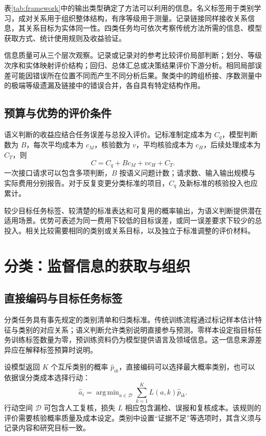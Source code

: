 \documentclass[UTF8,a4paper,zihao=-4,fontset=fandol]{ctexart}
\DeclareMathOperator*{\argmin}{arg\,min}
\begin{document}
表\ref{tab:framework}中的输出类型确定了方法可以利用的信息。名义标签用于类别学习，成对关系用于组织整体结构，有序等级用于测量。记录链接同样接收关系信息，其关系目标为实体同一性。四类任务均可依次考察传统方法所需的信息、模型获取方式、统计使用规则及收益验证。

信息质量可从三个层次观察。记录或记录对的参考比较评价局部判断；划分、等级次序和实体映射评价结构；回归、总体汇总或决策结果评价下游分析。相同局部误差可能因错误所在位置不同而产生不同分析后果。聚类中的跨组桥接、序数测量中的极端等级遗漏及链接中的错误合并，各自具有特定结构作用。

\subsection{预算与优势的评价条件}

语义判断的收益应结合任务误差与总投入评价。记标准制定成本为 $C_q$，模型判断数为 $B$，每次平均成本为 $c_M$，核验数为 $v$，平均核验成本为 $c_H$，后续处理成本为 $C_T$，则
\begin{equation}
 C=C_q+B c_M+v c_H+C_T.
 \label{eq:cost}
\end{equation}
一次接口请求可以包含多项判断，$B$ 按语义问题计数；请求数、输入输出规模与实际费用分别报告。对于反复变更分类标准的项目，$C_q$ 及新标准的核验投入也应累计。

较少目标任务标签、较清楚的标准表达和可复用的概率输出，为语义判断提供潜在适用场景。优势可表述为同一费用下较低的目标误差，或同一误差要求下较少的总投入。相关比较需要相同的类别或关系目标，以及独立于标准调整的评价材料。

\section{分类：监督信息的获取与组织}\label{sec:classification}

\subsection{直接编码与目标任务标签}

分类任务具有事先规定的类别清单和归类标准。传统训练流程通过标记样本估计特征与类别的对应关系；语义判断允许类别说明直接参与预测。零样本设定指目标任务训练标签数量为零，预训练资料仍为模型提供语言及领域信息\citep{yin2019}。这一信息来源差异应在解释标签预算时说明。

设模型返回 $K$ 个互斥类别的概率 $\widehat p_{ik}$，直接编码可以选择最大概率类别，也可以依据误分类成本选择行动：
\begin{equation}
 \widehat a_i=\argmin_{a\in\mathcal D}\sum_{k=1}^K L(a,k)\widehat p_{ik}.
 \label{eq:classification}
\end{equation}
行动空间 $\mathcal D$ 可包含人工复核，损失 $L$ 相应包含漏检、误报和复核成本。该规则的评价需要核验概率质量及成本设定。类别中设置“证据不足”等选项时，其含义须与记录内容和研究目标一致。
\end{document}
